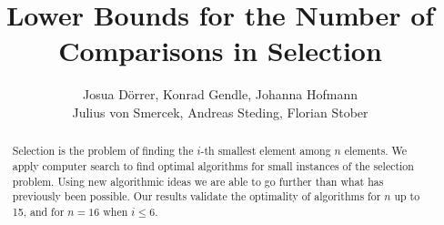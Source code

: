 \documentclass[twoside,leqno,twocolumn]{article}
\begin{document}
%
\newcommand\relatedversion{}



\title{\Large Lower Bounds for the Number of Comparisons in Selection\relatedversion}

\author{Josua Dörrer, Konrad Gendle, Johanna Hofmann \\ Julius von Smercek, Andreas Steding, Florian Stober} %

\date{}

\maketitle







\begin{abstract} \small\baselineskip=9pt
  Selection is the problem of finding the $i$-th smallest element among $n$ elements.
  We apply computer search to find optimal algorithms for small instances of the selection problem.
  Using new algorithmic ideas we are able to go further than what has previously been possible.
  Our results validate the optimality of algorithms for $n$ up to 15, and for $n=16$ when $i \leq 6$.

\end{abstract} %
\end{document}
